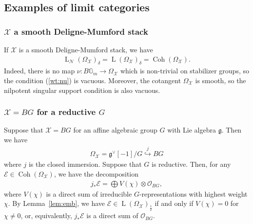 \documentclass [11pt,oneside,a4paper,mathscr]{amsart}
\theoremstyle{definition}
\newcommand{\LL}{\operatorname{L}}
\newcommand{\X}{\mathcal{X}}
\newcommand{\bgm}{B\mathbb{G}_m}
\newcommand{\Coh}{\operatorname{Coh}}
\begin{document}
\subsection{Examples of limit categories}\label{subsec:Exam}
\subsubsection{$\mathcal{X}$ a smooth Deligne-Mumford stack}
If $\X$ is a smooth Deligne-Mumford stack, we have 
\begin{align*}
\LL_{\mathcal{N}}(\Omega_{\X})_{\delta}=
    \LL(\Omega_{\X})_{\delta}=\Coh(\Omega_{\X}). 
\end{align*}
Indeed, there is no map $\nu \colon \bgm \to \Omega_{\X}$ 
which is non-trivial on stabilizer groups, so the condition (\ref{wt:nu}) 
is vacuous. Moreover, the cotangent $\Omega_{\X}$ is smooth, 
so the nilpotent singular support condition is also vacuous. 

\subsubsection{$\mathcal{X}=BG$ for a reductive $G$}\label{subsub:BG}
Suppose that $\X=BG$ for an affine algebraic group $G$ with Lie algebra $\mathfrak{g}$.
Then we have
\begin{align*}
    \Omega_{\X}=\mathfrak{g}^{\vee}[-1]/G\stackrel{j}{\hookrightarrow}BG 
\end{align*}
where $j$ is the closed immersion. 
Suppose that $G$ is reductive. Then, 
for any $\mathcal{E}\in \Coh(\Omega_{\X})$, 
we have the decomposition \begin{align*}j_{*}\mathcal{E}=\bigoplus V(\chi)\otimes \mathcal{O}_{BG},\end{align*}
where $V(\chi)$ is a direct sum of 
irreducible $G$-representations with highest weight $\chi$. 
By Lemma~\ref{lem:emb},
we have $\mathcal{E} \in \LL(\Omega_{\X})_{\frac{1}{2}}$ if and only if 
$V(\chi) =0$ for $\chi \neq 0$, or, equivalently, 
$j_{*}\mathcal{E}$ is a direct sum of $\mathcal{O}_{BG}$. 
\end{document}
